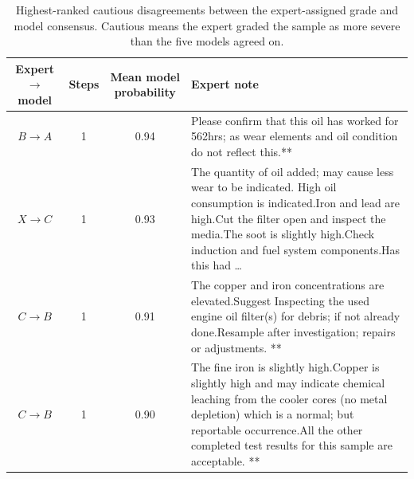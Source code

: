 \begin{table}[t]
\centering
\small
\caption{Highest-ranked cautious disagreements between the expert-assigned grade and model consensus. Cautious means the expert graded the sample as more severe than the five models agreed on.}
\label{tab:cautious_disagreements}
\begin{tabularx}{\linewidth}{c c c X}
\hline
Expert $\rightarrow$ model & Steps & Mean model probability & Expert note \\
\hline
$B \rightarrow A$ & 1 & 0.94 &
Please confirm that this oil has worked for 562hrs; as wear elements and oil condition do not reflect this.** \\
$X \rightarrow C$ & 1 & 0.93 &
The quantity of oil added; may cause less wear to be indicated. High oil consumption is indicated.Iron and lead are high.Cut the filter open and inspect the media.The soot is slightly high.Check induction and fuel system components.Has this had \ldots \\
$C \rightarrow B$ & 1 & 0.91 &
The copper and iron concentrations are elevated.Suggest Inspecting the used engine oil filter(s) for debris; if not already done.Resample after investigation; repairs or adjustments. ** \\
$C \rightarrow B$ & 1 & 0.90 &
The fine iron is slightly high.Copper is slightly high and may indicate chemical leaching from the cooler cores (no metal depletion) which is a normal; but reportable occurrence.All the other completed test results for this sample are acceptable. ** \\
\hline
\end{tabularx}
\end{table}
